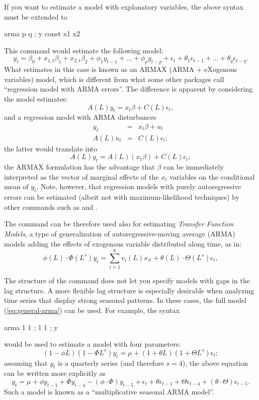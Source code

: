 If you want to estimate a model with explanatory variables, the above
syntax must be extended to
\begin{code}
  arma p q ; y const x1 x2
\end{code}
This command would estimate the following model:
\[
  y_t = \beta_0 + x_{1,t} \beta_1 + x_{2,t} \beta_2 + 
  \phi_1 y_{t-1} + \ldots + \phi_p y_{t-p} + 
  \epsilon_t + \theta_1 \epsilon_{t-1} + \ldots + \theta_q \epsilon_{t-q} .
\]
What  estimates in this case is known as an ARMAX (ARMA +
eXogenous variables) model, which is different from what some other packages
call ``regression model with ARMA errors''. The difference is apparent
by considering the model  estimates:
\begin{equation}
  \label{eq:armax}
  A(L) y_t = x_t \beta + C(L) \epsilon_t ,
\end{equation}
and a regression model with ARMA disturbances
\begin{eqnarray}
  \label{eq:reg-arma}
  y_t & = & x_t \beta + u_t \\
  A(L) u_t & = & C(L) \epsilon_t ;
\end{eqnarray}
the latter would translate into
\[
  A(L) y_t = A(L) \left(x_t \beta \right) + C(L) \epsilon_t ;
\]
the ARMAX formulation has the advantage that $\beta$ can be
immediately interpreted as the vector of marginal effects of the $x_t$
variables on the conditional mean of $y_t$.  Note, however, that
regression models with purely autoregressive errors can be estimated
(albeit not with maximum-likelihood techniques) by other 
commands such as  and . 

The  command can be therefore used also for estimating
\emph{Transfer Function Models}, a type of generalization of
autoregressive-moving average (ARMA) models adding the effects of
exogenous variable distributed along time, as in:
\begin{equation}
  \label{eq:tfunc-model}
  \phi (L) \cdot \Phi (L^s) y_t = \sum_{i=1}^kv_{i}(L)x_{it} + \theta (L)\cdot \Theta (L^s) \epsilon_t ,
\end{equation}

The structure of the  command does not let you specify
models with gaps in the lag structure. A more flexible lag
structure is especially desirable when analyzing time series that
display strong seasonal patterns. In these cases, the full model
(\ref{eq:general-arma}) can be used. For example, the syntax
\begin{code}
  arma 1 1 ; 1 1 ; y
\end{code}
would be used to estimate a model with four parameters:
\[
  ( 1 - \phi L )  ( 1 - \Phi L^s ) y_t = \mu + ( 1 + \theta L ) ( 1 + \Theta L^s ) \epsilon_t;
\]
assuming that $y_t$ is a quarterly series (and therefore $s=4$), the
above equation can be written more explicitly as
\[
  y_t = \mu + \phi y_{t-1} + \Phi y_{t-4} - (\phi \cdot \Phi) y_{t-5} + 
  \epsilon_t + \theta \epsilon_{t-1} + \Theta \epsilon_{t-4} +
  (\theta \cdot \Theta) \epsilon_{t-5} .
\]
Such a model is known as a ``multiplicative seasonal ARMA model''.


